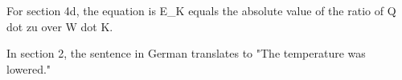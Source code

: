 For section 4d, the equation is E_K equals the absolute value of the ratio of Q dot zu over W dot K.

In section 2, the sentence in German translates to "The temperature was lowered."